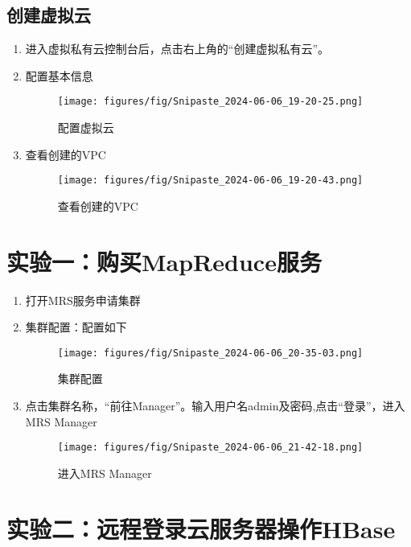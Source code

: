 \documentclass[12pt,hyperref,a4paper,UTF8]{ctexart}
\begin{document}
\subsection*{创建虚拟云}

\begin{enumerate}
    \item 进入虚拟私有云控制台后，点击右上角的“创建虚拟私有云”。
    \item 配置基本信息
    \begin{figure}[H]
        \centering
        \texttt{[image: figures/fig/Snipaste\_2024-06-06\_19-20-25.png]}
        \caption{配置虚拟云}
        \label{fig:6}
    \end{figure}
    \item 查看创建的VPC
    \begin{figure}[H]
        \centering
        \texttt{[image: figures/fig/Snipaste\_2024-06-06\_19-20-43.png]}
        \caption{查看创建的VPC}
        \label{fig:7}
    \end{figure}
\end{enumerate}



\section{实验一：购买MapReduce服务}


\begin{enumerate}
    \item 打开MRS服务申请集群
    \item 集群配置：配置如下
    \begin{figure}[H]
        \centering
        \texttt{[image: figures/fig/Snipaste\_2024-06-06\_20-35-03.png]}
        \caption{集群配置}
        \label{fig:8}
    \end{figure}
    \item 点击集群名称，“前往Manager”。输入用户名admin及密码,点击“登录”，进入MRS Manager
    \begin{figure}[H]
        \centering
        \texttt{[image: figures/fig/Snipaste\_2024-06-06\_21-42-18.png]}
        \caption{进入MRS Manager}
        \label{fig:8}
    \end{figure}    
\end{enumerate}


\section{实验二：远程登录云服务器操作HBase}
\end{document}
